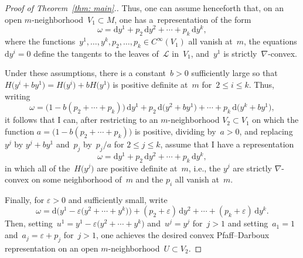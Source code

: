 \documentclass[10pt,a4paper]{amsart}
\renewcommand{\d}{\mathrm{d}}%
\newcommand{\cL}{{\mathcal L}}
\numberwithin{equation}{section}
\begin{document}
\begin{proof}[Proof of Theorem~\ref{thm: main}.]
Thus, one can assume henceforth that,
on an open $m$-neighborhood~$V_1\subset M$,
one has a~representation of the form
\[
\omega = \d y^1 + p_2\,\d y^2 +\cdots + p_k\,\d y^k,
\]
where the functions~$y^1,\ldots,y^k,p_2,\ldots,p_k\in C^\infty(V_1)$
all vanish at~$m$,
the equations $\d y^i=0$ define the tangents to the leaves of~$\cL$ in~$V_1$,
and~$y^1$ is strictly~$\nabla$-convex.

Under these assumptions, there is a constant~$b>0$ sufficiently large
so that $H\big(y^i+by^1\big) = H\big(y^i\big)+b H\big(y^1\big)$ is positive definite at~$m$
for~$2\le i\le k$.
Thus, writing
\[
\omega = \bigl(1-b(p_2{+}\cdots{+}p_k)\bigr)\,\d y^1 + p_2\,\d\big(y^2+b y^1\big)
   + \cdots + p_k\,\d\big(y^k+b y^1\big),
\]
it follows that I can,
after restricting to an $m$-neighborhood $V_2\subset V_1$ on which
the function $a = \bigl(1-b(p_2{+}\cdots{+}p_k)\bigr)$ is positive,
dividing by~$a>0$,
and replacing~$y^j$ by $y^j+by^1$ and~$p_j$ by~$p_j/a$ for $2\le j\le k$,
assume that I have a representation
\[
\omega = \d y^1 + p_2\,\d y^2 +\cdots + p_k\,\d y^k,
\]
in which all of the~$H\big(y^j\big)$ are positive definite at~$m$,
i.e., the $y^j$ are strictly $\nabla$-convex on some neighborhood of~$m$
and the $p_i$ all vanish at~$m$.

Finally, for $\varepsilon>0$ and sufficiently small, write
\[
\omega = \d\bigl(y^1-\varepsilon\big(y^2{+}\cdots{+}y^k\big)\bigr)
   + (p_2 + \varepsilon)\,\d y^2
   + \cdots + (p_k + \varepsilon)\,\d y^k.
\]
Then, setting~$u^1 = y^1-\varepsilon\big(y^2+\cdots+y^k\big)$ and~$u^j = y^j$
for~$j>1$ and setting~$a_1 = 1$ and~${a_j = \varepsilon + p_j}$ for~$j>1$,
one achieves the desired convex Pfaff--Darboux representation
on an open $m$-neigh\-bor\-hood~$U\subset V_2$.
\end{proof}
\end{document}
